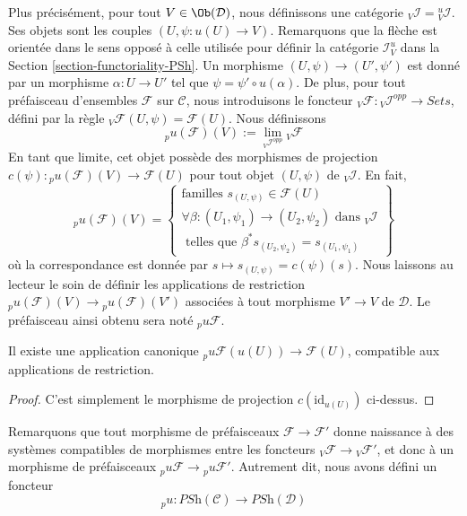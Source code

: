 \medskip\noindent
Plus précisément, pour tout $V \in \Ob(\mathcal{D})$,
nous définissons une catégorie ${}_V\mathcal{I} = {}_V^u\mathcal{I}$.
Ses objets sont les couples $(U, \psi : u(U) \to V)$.
Remarquons que la flèche est orientée dans le sens opposé à celle utilisée
pour définir la catégorie $\mathcal{I}_V^u$ dans la
Section \ref{section-functoriality-PSh}.
Un morphisme $(U, \psi) \to (U', \psi')$ est donné par un morphisme
$\alpha : U \to U'$ tel que $\psi = \psi' \circ u(\alpha)$.
De plus, pour tout préfaisceau d’ensembles $\mathcal{F}$ sur $\mathcal{C}$,
nous introduisons le foncteur
${}_V\mathcal{F} : {}_V\mathcal{I}^{opp} \to \textit{Sets}$,
défini par la règle ${}_V\mathcal{F}(U, \psi) = \mathcal{F}(U)$.
Nous définissons
$$
{}_pu(\mathcal{F})(V) := \lim_{{}_V\mathcal{I}^{opp}} {}_V\mathcal{F}
$$
En tant que limite, cet objet possède des morphismes de projection
$c(\psi) : {}_pu(\mathcal{F})(V) \to \mathcal{F}(U)$
pour tout objet $(U, \psi)$ de ${}_V\mathcal{I}$.
En fait,
$$
{}_pu(\mathcal{F})(V)
=
\left\{
\begin{matrix}
\text{familles }
s_{(U, \psi)} \in \mathcal{F}(U) \\
\forall \beta : (U_1, \psi_1) \to (U_2, \psi_2)
\text{ dans }{}_V\mathcal{I} \\
\text{ telles que } \beta^*s_{(U_2, \psi_2)} = s_{(U_1, \psi_1)}
\end{matrix}
\right\}
$$
où la correspondance est donnée par
$s \mapsto s_{(U, \psi)} = c(\psi)(s)$.
Nous laissons au lecteur le soin de définir les applications de restriction
${}_pu(\mathcal{F})(V) \to {}_pu(\mathcal{F})(V')$
associées à tout morphisme $V' \to V$ de $\mathcal{D}$.
Le préfaisceau ainsi obtenu sera noté ${}_pu\mathcal{F}$.

\begin{lemma}
\label{lemma-recover-pu}
Il existe une application canonique
${}_pu\mathcal{F}(u(U)) \to \mathcal{F}(U)$,
compatible aux applications de restriction.
\end{lemma}

\begin{proof}
C’est simplement le morphisme de projection $c(\text{id}_{u(U)})$ ci-dessus.
\end{proof}

\noindent
Remarquons que tout morphisme de préfaisceaux
$\mathcal{F} \to \mathcal{F}'$ donne naissance à des systèmes compatibles
de morphismes entre les foncteurs
${}_V\mathcal{F} \to {}_V\mathcal{F}'$, et donc à un morphisme de préfaisceaux
${}_pu\mathcal{F} \to {}_pu\mathcal{F}'$.
Autrement dit, nous avons défini un foncteur
$$
{}_pu :
\textit{PSh}(\mathcal{C})
\longrightarrow
\textit{PSh}(\mathcal{D})
$$

